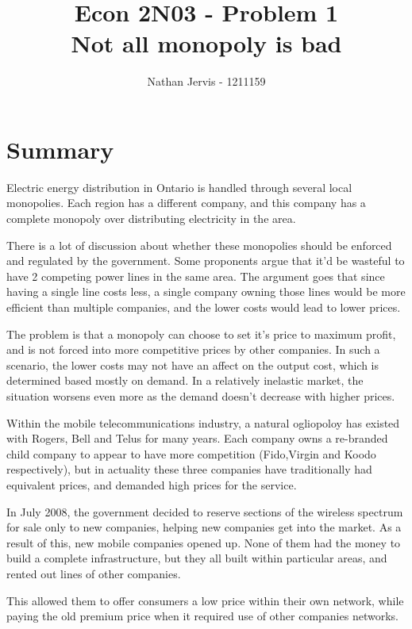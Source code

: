 \documentclass{article}
\title{\vspace{-3.5cm}Econ 2N03 - Problem 1\\Not all monopoly is bad}
\author{Nathan Jervis - 1211159}
\begin{document}
\maketitle

\vspace{-1.2cm}
\section{Summary}

Electric energy distribution in Ontario is handled through several local monopolies. Each region has a different company, and this company has a complete monopoly over distributing electricity in the area.

There is a lot of discussion about whether these monopolies should be enforced and regulated by the government. Some proponents argue that it'd be wasteful to have 2 competing power lines in the same area. The argument goes that since having a single line costs less, a single company owning those lines would be more efficient than multiple companies, and the lower costs would lead to lower prices.

The problem is that a monopoly can choose to set it's price to maximum profit, and is not forced into more competitive prices by other companies. In such a scenario, the lower costs may not have an affect on the output cost, which is determined based mostly on demand. In a relatively inelastic market, the situation worsens even more as the demand doesn't decrease with higher prices.

Within the mobile telecommunications industry, a natural ogliopoloy has existed with Rogers, Bell and Telus for many years. Each company owns a re-branded child company to appear to have more competition (Fido,Virgin and Koodo respectively), but in actuality these three companies have traditionally had equivalent prices, and demanded high prices for the service.

In July 2008, the government decided to reserve sections of the wireless spectrum for sale only to new companies, helping new companies get into the market. As a result of this, new mobile companies opened up. None of them had the money to build a complete infrastructure, but they all built within particular areas, and rented out lines of other companies.

This allowed them to offer consumers a low price within their own network, while paying the old premium price when it required use of other companies networks.
\end{document}
